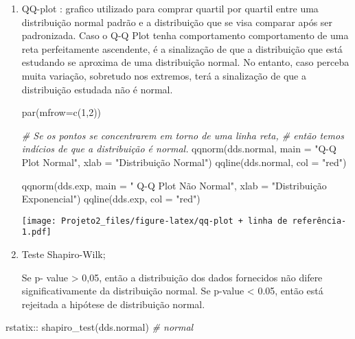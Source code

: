 \documentclass[
]{article}
\newenvironment{Shaded}{\begin{snugshade}}{\end{snugshade}}
\newcommand{\AttributeTok}[1]{\textcolor[rgb]{0.77,0.63,0.00}{#1}}
\newcommand{\CommentTok}[1]{\textcolor[rgb]{0.56,0.35,0.01}{\textit{#1}}}
\newcommand{\DecValTok}[1]{\textcolor[rgb]{0.00,0.00,0.81}{#1}}
\newcommand{\FunctionTok}[1]{\textcolor[rgb]{0.00,0.00,0.00}{#1}}
\newcommand{\NormalTok}[1]{#1}
\newcommand{\SpecialCharTok}[1]{\textcolor[rgb]{0.00,0.00,0.00}{#1}}
\newcommand{\StringTok}[1]{\textcolor[rgb]{0.31,0.60,0.02}{#1}}
\begin{document}
\begin{enumerate}
\def\labelenumi{\arabic{enumi}.}
\setcounter{enumi}{1}
\item
  QQ-plot : grafico utilizado para comprar quartil por quartil entre uma
  distribuição normal padrão e a distribuição que se visa comparar após
  ser padronizada. Caso o Q-Q Plot tenha comportamento comportamento de
  uma reta perfeitamente ascendente, é a sinalização de que a
  distribuição que está estudando se aproxima de uma distribuição
  normal. No entanto, caso perceba muita variação, sobretudo nos
  extremos, terá a sinalização de que a distribuição estudada não é
  normal.

\begin{Shaded}
\begin{Highlighting}[]
\FunctionTok{par}\NormalTok{(}\AttributeTok{mfrow=}\FunctionTok{c}\NormalTok{(}\DecValTok{1}\NormalTok{,}\DecValTok{2}\NormalTok{))}

\CommentTok{\# Se os pontos se concentrarem em torno de uma linha reta, \# então temos indícios de que a distribuição é normal. }
\FunctionTok{qqnorm}\NormalTok{(dds.normal, }\AttributeTok{main =} \StringTok{"Q{-}Q Plot Normal"}\NormalTok{, }\AttributeTok{xlab =} \StringTok{"Distribuição Normal"}\NormalTok{) }
\FunctionTok{qqline}\NormalTok{(dds.normal, }\AttributeTok{col =} \StringTok{"red"}\NormalTok{) }

\FunctionTok{qqnorm}\NormalTok{(dds.exp, }\AttributeTok{main =} \StringTok{" Q{-}Q Plot Não Normal"}\NormalTok{, }\AttributeTok{xlab =} \StringTok{"Distribuição Exponencial"}\NormalTok{) }
\FunctionTok{qqline}\NormalTok{(dds.exp, }\AttributeTok{col =} \StringTok{"red"}\NormalTok{) }
\end{Highlighting}
\end{Shaded}

  \texttt{[image: Projeto2\_files/figure-latex/qq-plot + linha de referência-1.pdf]}
\item
  Teste Shapiro-Wilk;

  Se p- value \textgreater{} 0,05, então a distribuição dos dados
  fornecidos não difere significativamente da distribuição normal. Se
  p-value \textless{} 0.05, então está rejeitada a hipótese de
  distribuição normal.
\end{enumerate}

\begin{Shaded}
\begin{Highlighting}[]
\NormalTok{rstatix}\SpecialCharTok{::} \FunctionTok{shapiro\_test}\NormalTok{(dds.normal) }\CommentTok{\# normal }
\end{Highlighting}
\end{Shaded}
\end{document}
